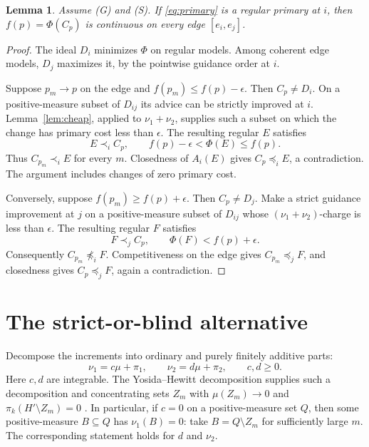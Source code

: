 \documentclass[11pt]{article}
\newtheorem{lemma}[theorem]{Lemma}
\theoremstyle{remark}\newtheorem{remark}[theorem]{Remark}
\begin{document}
\begin{lemma}\label{lem:continuity}
Assume (G) and (S). If \eqref{eq:primary} is a regular primary at $i$, then
$f(p)=\Phi(C_p)$ is continuous on every edge $[e_i,e_j]$.
\end{lemma}
\begin{proof}
The ideal $D_i$ minimizes $\Phi$ on regular models. Among coherent edge
models, $D_j$ maximizes it, by the pointwise guidance order at $i$.

Suppose $p_m\to p$ on the edge and $f(p_m)\le f(p)-\epsilon$.
Then $C_p\ne D_i$. On a positive-measure subset of $D_{ij}$ its advice
can be strictly improved at $i$. Lemma~\ref{lem:cheap}, applied to
$\nu_1+\nu_2$, supplies such a subset on which the change has primary
cost less than $\epsilon$. The resulting regular $E$ satisfies
\[
 E\prec_i C_p,\qquad f(p)-\epsilon<\Phi(E)\le f(p).
\]
Thus $C_{p_m}\prec_i E$ for every $m$. Closedness of $A_i(E)$ gives
$C_p\preceq_i E$, a contradiction. The argument includes changes of
zero primary cost.

Conversely, suppose $f(p_m)\ge f(p)+\epsilon$. Then $C_p\ne D_j$.
Make a strict guidance improvement at $j$ on a positive-measure subset
of $D_{ij}$ whose $(\nu_1+\nu_2)$-charge is less than $\epsilon$.
The resulting regular $F$ satisfies
\[
 F\prec_j C_p,\qquad \Phi(F)<f(p)+\epsilon.
\]
Consequently $C_{p_m}\not\preceq_i F$. Competitiveness on the edge gives
$C_{p_m}\preceq_j F$, and closedness gives $C_p\preceq_j F$, again a
contradiction.
\end{proof}

\section{The strict-or-blind alternative}

Decompose the increments into ordinary and purely finitely additive parts:
\begin{equation}
 \nu_1=c\mu+\pi_1,\qquad \nu_2=d\mu+\pi_2,\qquad c,d\ge0.
 \label{eq:split}
\end{equation}
Here $c,d$ are integrable. The Yosida--Hewitt decomposition supplies such a
decomposition and concentrating sets $Z_m$ with $\mu(Z_m)\to0$ and
$\pi_k(H'\setminus Z_m)=0$ \cite[Theorem 1 and its proof]{PP}.
In particular, if $c=0$ on a positive-measure set $Q$, then some
positive-measure $B\subseteq Q$ has $\nu_1(B)=0$: take
$B=Q\setminus Z_m$ for sufficiently large $m$. The corresponding statement
holds for $d$ and $\nu_2$.
\end{document}
